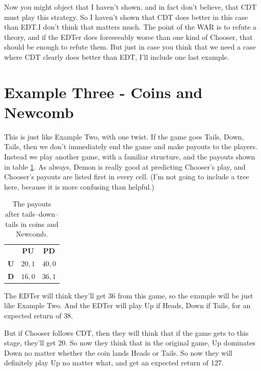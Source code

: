 \documentclass[
  12pt,
]{article}
\begin{document}
Now you might object that I haven't shown, and in fact don't believe, that CDT must play this strategy. So I haven't shown that CDT does better in this case than EDT.I don't think that matters much. The point of the WAR is to refute a theory, and if the EDTer does foreseeably worse than one kind of Chooser, that should be enough to refute them. But just in case you think that we need a case where CDT clearly does better than EDT, I'll include one last example.

\hypertarget{example-three---coins-and-newcomb}{%
\section{Example Three - Coins and Newcomb}\label{example-three---coins-and-newcomb}}

This is just like Example Two, with one twist. If the game goes Tails, Down, Tails, then we don't immediately end the game and make payouts to the players. Instead we play another game, with a familiar structure, and the payouts shown in table \ref{tab:third-anti-war}. As always, Demon is really good at predicting Chooser's play, and Chooser's payouts are listed first in every cell. (I'm not going to include a tree here, because it is more confusing than helpful.)

\renewcommand{\arraystretch}{1.3}   
\begin{table}

\caption{\label{tab:third-anti-war}The payouts after tails–down–tails in coins and Newcomb.}
\centering \vspace{6pt}
\begin{tabular}[t]{>{}r>{}c>{}c}

\textbf{} & \textbf{PU} & \textbf{PD}\\

\textbf{U} & $20, 1$ & $40, 0$\\
\textbf{D} & $16, 0$ & $36, 1$\\

\end{tabular}
\end{table}

The EDTer will think they'll get 36 from this game, so the example will be just like Example Two. And the EDTer will play Up if Heads, Down if Tails, for an expected return of 38.

But if Chooser follows CDT, then they will think that if the game gets to this stage, they'll get 20. So now they think that in the original game, Up dominates Down no matter whether the coin lands Heads or Tails. So now they will definitely play Up no matter what, and get an expected return of 127.
\end{document}
